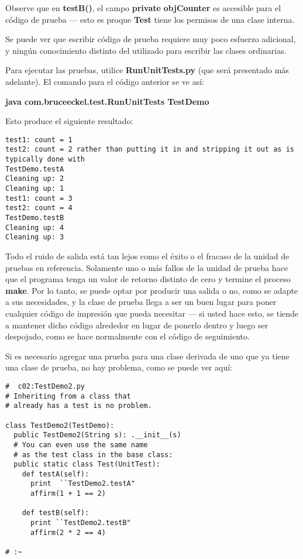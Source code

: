 Observe que en \textbf{testB()}, el campo \textbf{private } \textbf{objCounter} es accesible para el código de prueba — esto es proque \textbf{Test} tiene los permisos de una clase interna.  \newline

Se puede ver que escribir código de prueba requiere muy poco esfuerzo adicional, y ningún conocimiento distinto del utilizado para escribir las clases ordinarias.  \newline

Para ejecutar las pruebas, utilice \textbf{RunUnitTests.py} (que será presentado más adelante). El comando para el código anterior se ve así:   \newline

\textbf{java com.bruceeckel.test.RunUnitTests TestDemo} \newline

Esto produce el siguiente resultado: \newline

\begin{lstlisting}
test1: count = 1 
test2: count = 2 rather than putting it in and stripping it out as is typically done with 
TestDemo.testA 
Cleaning up: 2 
Cleaning up: 1 
test1: count = 3 
test2: count = 4 
TestDemo.testB 
Cleaning up: 4 
Cleaning up: 3 
\end{lstlisting}

Todo el ruido de salida está tan lejos como el éxito o el fracaso de la unidad de pruebas en referencia. Solamente uno o más fallos de la unidad de prueba hace que el programa tenga un valor de retorno distinto de cero y termine el proceso \textbf{make}. Por lo tanto, se puede optar por producir una salida o no, como se adapte a sus necesidades, y la clase de prueba llega a ser un buen lugar para poner cualquier código de impresión que pueda necesitar — si usted hace esto, se tiende a mantener dicho código alrededor en lugar de ponerlo dentro y luego ser despojado, como se hace normalmente con el código de seguimiento.   \newline

Si es necesario agregar una prueba para una clase derivada de uno que ya tiene una clase de prueba, no hay problema, como se puede ver aquí:     \newline

\begin{lstlisting}
#  c02:TestDemo2.py 
# Inheriting from a class that  
# already has a test is no problem. 

class TestDemo2(TestDemo): 
  public TestDemo2(String s): .__init__(s)  
  # You can even use the same name  
  # as the test class in the base class: 
  public static class Test(UnitTest): 
    def testA(self): 
      print  ``TestDemo2.testA"
      affirm(1 + 1 == 2) 
      
    def testB(self): 
      print ``TestDemo2.testB" 
      affirm(2 * 2 == 4) 
      
# :~ 
\end{lstlisting}

